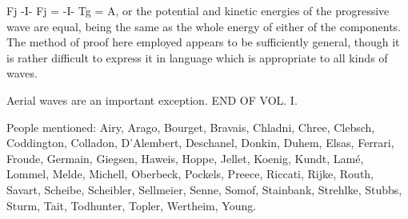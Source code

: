 Fj -I- Fj = -I- Tg = A, or the potential and kinetic energies of the
progressive wave are equal, being the same as the whole energy of
either of the components. The method of proof here employed appears
to be sufficiently general, though it is rather difficult to express it in
language which is appropriate to all kinds of waves.

 Aerial waves are an important exception.
END OF VOL. I.

People mentioned:
Airy, Arago, Bourget, Bravais, Chladni, Chree, Clebsch, Coddington, Colladon,
D'Alembert, Deschanel, Donkin, Duhem, Elsas, Ferrari, Froude, Germain, Giegsen,
Haweis, Hoppe, Jellet, Koenig, Kundt, Lamé, Lommel, Melde, Michell, Oberbeck,
Pockels, Preece, Riccati, Rijke, Routh, Savart, Scheibe, Scheibler, Sellmeier,
Senne, Somof, Stainbank, Strehlke, Stubbs, Sturm, Tait, Todhunter, Topler,
Wertheim, Young.
